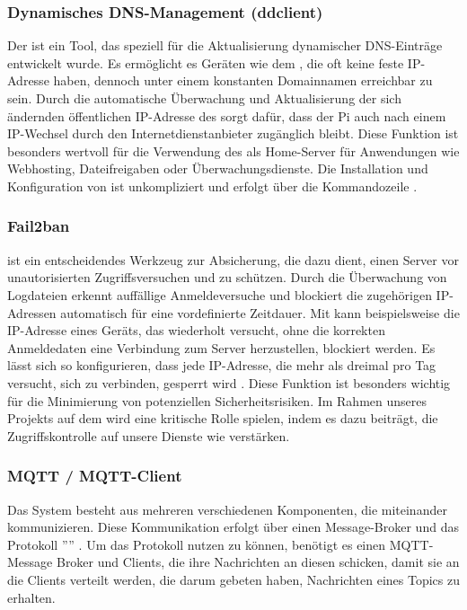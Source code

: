 \subsubsection{Dynamisches DNS-Management (ddclient)}
Der  ist ein Tool, das speziell für die Aktualisierung dynamischer DNS-Einträge entwickelt wurde. Es ermöglicht es Geräten wie dem , die oft keine feste IP-Adresse haben, dennoch unter einem konstanten Domainnamen erreichbar zu sein. Durch die automatische Überwachung und Aktualisierung der sich ändernden öffentlichen IP-Adresse des  sorgt  dafür, dass der Pi auch nach einem IP-Wechsel durch den Internetdienstanbieter zugänglich bleibt. Diese Funktion ist besonders wertvoll für die Verwendung des  als Home-Server für Anwendungen wie Webhosting, Dateifreigaben oder Überwachungsdienste. Die Installation und Konfiguration von  ist unkompliziert und erfolgt über die Kommandozeile \cite{Ddclient}.

\subsubsection{Fail2ban}
 ist ein entscheidendes Werkzeug zur Absicherung, die dazu dient, einen Server vor unautorisierten Zugriffsversuchen und  zu schützen. Durch die Überwachung von Logdateien erkennt  auffällige Anmeldeversuche und blockiert die zugehörigen IP-Adressen automatisch für eine vordefinierte Zeitdauer. Mit  kann beispielsweise die IP-Adresse eines Geräts, das wiederholt versucht, ohne die korrekten Anmeldedaten eine Verbindung zum Server herzustellen, blockiert werden. Es lässt sich so konfigurieren, dass jede IP-Adresse, die mehr als dreimal pro Tag versucht, sich zu verbinden, gesperrt wird \cite{Fail2ban}. Diese Funktion ist besonders wichtig für die Minimierung von potenziellen Sicherheitsrisiken. Im Rahmen unseres Projekts auf dem  wird  eine kritische Rolle spielen, indem es dazu beiträgt, die Zugriffskontrolle auf unsere Dienste wie  verstärken.

\subsubsection{MQTT / MQTT-Client}
Das System besteht aus mehreren verschiedenen Komponenten, die miteinander kommunizieren. Diese Kommunikation erfolgt über einen Message-Broker und das Protokoll '''' \cite{MQTT}. Um das Protokoll nutzen zu können, benötigt es einen MQTT-Message Broker und Clients, die ihre Nachrichten an diesen schicken, damit sie an die Clients verteilt werden, die darum gebeten haben, Nachrichten eines Topics zu erhalten.

